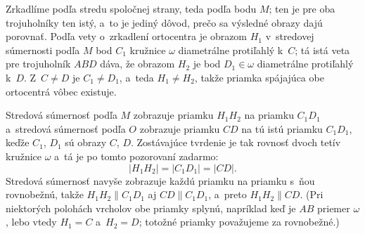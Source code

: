{    Zrkadlíme podľa stredu spoločnej strany, teda podľa bodu $M$; ten je pre oba trojuholníky ten istý, a~to je jediný dôvod, prečo sa výsledné obrazy dajú porovnať. Podľa vety o~zrkadlení ortocentra je obrazom $H_1$ v~stredovej súmernosti podľa $M$ bod $C_1$ kružnice $\omega$ diametrálne protiľahlý k~$C$; tá istá veta pre trojuholník $ABD$ dáva, že obrazom $H_2$ je bod $D_1 \in \omega$ diametrálne protiľahlý k~$D$. Z~$C \neq D$ je $C_1 \neq D_1$, a~teda $H_1 \neq H_2$, takže priamka spájajúca obe ortocentrá vôbec existuje.

    Stredová súmernosť podľa $M$ zobrazuje priamku $H_1H_2$ na priamku $C_1D_1$ a~stredová súmernosť podľa $O$ zobrazuje priamku $CD$ na tú istú priamku $C_1D_1$, keďže $C_1$, $D_1$ sú obrazy $C$, $D$. Zostávajúce tvrdenie je tak rovnosť dvoch tetív kružnice $\omega$ a~tá je po tomto pozorovaní zadarmo:
    $$
    |H_1H_2| = |C_1D_1| = |CD|.
    $$
    Stredová súmernosť navyše zobrazuje každú priamku na priamku s~ňou rovnobežnú, takže $H_1H_2 \parallel C_1D_1$ aj $CD \parallel C_1D_1$, a~preto $H_1H_2 \parallel CD$. (Pri niektorých polohách vrcholov obe priamky splynú, napríklad keď je $AB$ priemer $\omega$, lebo vtedy $H_1 = C$ a~$H_2 = D$; totožné priamky považujeme za rovnobežné.)
}


